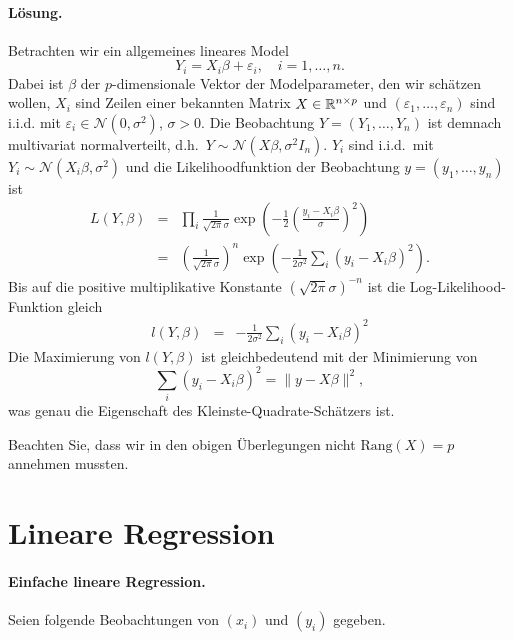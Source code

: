 \paragraph*{Lösung. } Betrachten wir ein allgemeines lineares Model
\begin{equation}
    Y_i =  X_i \beta+ \varepsilon_i, \quad i=1,\ldots,n.
\end{equation}
Dabei ist $\beta$ der $p$-dimensionale Vektor der Modelparameter, den wir schätzen wollen,
$X_i$ sind Zeilen einer bekannten Matrix $X\in\mathbb R^{n\times p}$ und 
$\left( \varepsilon_1, \ldots, \varepsilon_n \right)$ sind i.i.d. mit 
$\varepsilon_i \in\mathcal N(0,\sigma^2)$, $\sigma>0$. Die Beobachtung
$Y=\left( Y_1,\ldots,Y_n \right)$ ist demnach multivariat normalverteilt, d.h.\ 
$Y\sim\mathcal N(X\beta,\sigma^2 I_n)$. $Y_i$ sind i.i.d.\ mit
$Y_i\sim\mathcal N(X_i \beta, \sigma^2 )$ und die Likelihoodfunktion der Beobachtung 
$y=\left( y_1,\ldots, y_n \right)$ ist 
\begin{eqnarray}
    L(Y, \beta) &=&  \prod_i \frac{1}{ \sqrt{2\pi} \sigma} 
    \exp\left( - \frac{1}{2} \left( \frac{y_i - X_i \beta }{\sigma}  \right)^2 \right) \\
    &=& \left( \frac{1}{\sqrt{2\pi}\sigma} \right)^n 
    \exp \left( -\frac{1}{2 \sigma^2} \sum_{i}^{} \left( y_i - X_i\beta \right)^2 \right).
\end{eqnarray}
Bis auf die positive multiplikative Konstante $\left( \sqrt{2 \pi}\sigma \right)^{-n}$ ist 
die Log-Likelihood-Funktion gleich
\begin{eqnarray}
    l(Y, \beta) &=& -\frac{1}{2 \sigma^2}  \sum_{i}^{} \left( y_i - X_i \beta \right)^2 
\end{eqnarray}
Die Maximierung von $l(Y, \beta)$ ist gleichbedeutend mit der Minimierung von 
\begin{equation}
    \sum_{i}^{} \left( y_i - X_i \beta \right)^2 = \| y - X \beta \|^2, 
\end{equation}
was genau die Eigenschaft des Kleinste-Quadrate-Schätzers ist. 

Beachten Sie, dass wir in den obigen Überlegungen nicht
$\textrm{Rang}\left( X \right)=p$ annehmen mussten.





\section{Lineare Regression}

\paragraph{Einfache lineare Regression. } Seien folgende Beobachtungen von $(x_i)$ und $(y_i)$ 
gegeben.

